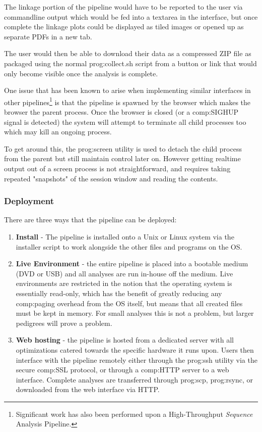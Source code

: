 The linkage portion of the pipeline would have to be reported to the user via commandline output which would be fed into a textarea in the interface, but once complete the linkage plots could be displayed as tiled images or opened up as separate PDFs in a new tab.

\enlargethispage{\baselineskip}

The user would then be able to download their data as a compressed ZIP file as packaged using the normal \gls{prog:collect.sh} script from a button or link that would only become visible once the analysis is complete.

One issue that has been known to arise when implementing similar interfaces in other pipelines\footnote{Significant work has also been performed upon a High-Throughput \textit{Sequence} Analysis Pipeline.} is that the pipeline is spawned by the browser which makes the browser the parent process. Once the browser is closed (or a \gls{comp:SIGHUP} signal is detected) the system will attempt to terminate all child processes too which may kill an ongoing process.

To get around this, the \gls{prog:screen} utility is used to detach the child process from the parent but still maintain control later on. However getting realtime output out of a screen process is not straightforward, and requires taking repeated "snapshots" of the session window and reading the contents.


\subsubsection{Deployment}

There are three ways that the pipeline can be deployed:
\begin{enumerate}
\item{{\bf Install} - The pipeline is installed onto a Unix or Linux system via the installer script to work alongside the other files and programs on the OS.}
\item{{\bf Live Environment} - the entire pipeline is placed into a bootable medium (DVD or USB) and all analyses are run in-house off the medium. Live environments are restricted in the notion that the operating system is essentially read-only, which has the benefit of greatly reducing any \gls{comp:paging} overhead from the OS itself, but means that all created files must be kept in memory. For small analyses this is not a problem, but larger pedigrees will prove a problem.}
\item{{\bf Web hosting} - the pipeline is hosted from a dedicated server with all optimizations catered towards the specific hardware it runs upon. Users then interface with the pipeline remotely either through the \gls{prog:ssh} utility via the secure \gls{comp:SSL} protocol, or through a \gls{comp:HTTP} server to a web interface. Complete analyses are transferred through \gls{prog:scp}, \gls{prog:rsync}, or downloaded from the web interface via HTTP.}
\end{enumerate}

